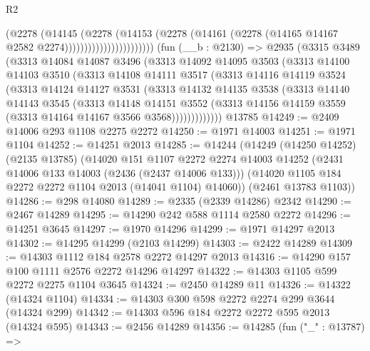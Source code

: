 \begin{lexlean}{R2}
\begin{coremodule}
                                  (@2278
                                    (@14145
                                      (@2278
                                        (@14153
                                          (@2278
                                            (@14161
                                              (@2278
                                                (@14165 @14167 @2582 @2274)))))))))))))))))))))))
    (fun (__b : @2130) =>
    @2935
      (@3315
        @3489
        (@3313
          @14084
          @14087
          @3496
          (@3313
            @14092
            @14095
            @3503
            (@3313
              @14100
              @14103
              @3510
              (@3313
                @14108
                @14111
                @3517
                (@3313
                  @14116
                  @14119
                  @3524
                  (@3313
                    @14124
                    @14127
                    @3531
                    (@3313
                      @14132
                      @14135
                      @3538
                      (@3313
                        @14140
                        @14143
                        @3545
                        (@3313
                          @14148
                          @14151
                          @3552
                          (@3313 @14156 @14159 @3559 (@3313 @14164 @14167 @3566 @3568)))))))))))))
    @13785
@14249 := @2409 @14006 @293 @1108 @2275 @2272
@14250 := @1971 @14003
@14251 := @1971 @1104
@14252 := @14251 @2013
@14285 := @14244
    (@14249
      (@14250 @14252)
      (@2135 @13785)
      (@14020
        @151
        @1107
        @2272
        @2274
        @14003
        @14252
        (@2431 @14006 @133 @14003 (@2436 (@2437 @14006 @133)))
        (@14020 @1105 @184 @2272 @2272 @1104 @2013 (@14041 @1104) @14060))
      (@2461 @13783 @1103))
@14286 := @298 @14080
@14289 := @2335 (@2339 @14286) @2342
@14290 := @2467 @14289
@14295 := @14290 @242 @588 @1114 @2580 @2272
@14296 := @14251 @3645
@14297 := @1970 @14296
@14299 := @1971 @14297 @2013
@14302 := @14295 @14299 (@2103 @14299)
@14303 := @2422 @14289
@14309 := @14303 @1112 @184 @2578 @2272 @14297 @2013
@14316 := @14290 @157 @100 @1111 @2576 @2272 @14296 @14297
@14322 := @14303 @1105 @599 @2272 @2275 @1104 @3645
@14324 := @2450 @14289 @11
@14326 := @14322 (@14324 @1104)
@14334 := @14303 @300 @598 @2272 @2274 @299 @3644 (@14324 @299)
@14342 := @14303 @596 @184 @2272 @2272 @595 @2013 (@14324 @595)
@14343 := @2456 @14289
@14356 := @14285
    (fun ("_" : @13787) =>

\end{coremodule}
\end{lexlean}
